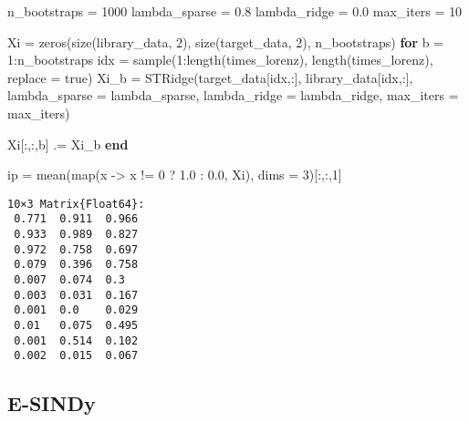 \documentclass[
]{article}
\newenvironment{Shaded}{\begin{snugshade}}{\end{snugshade}}
\newcommand{\ConstantTok}[1]{\textcolor[rgb]{0.56,0.35,0.01}{#1}}
\newcommand{\ControlFlowTok}[1]{\textcolor[rgb]{0.00,0.23,0.31}{\textbf{#1}}}
\newcommand{\FloatTok}[1]{\textcolor[rgb]{0.68,0.00,0.00}{#1}}
\newcommand{\FunctionTok}[1]{\textcolor[rgb]{0.28,0.35,0.67}{#1}}
\newcommand{\NormalTok}[1]{\textcolor[rgb]{0.00,0.23,0.31}{#1}}
\newcommand{\OperatorTok}[1]{\textcolor[rgb]{0.37,0.37,0.37}{#1}}
\begin{document}
\begin{Shaded}
\begin{Highlighting}[]
\NormalTok{n\_bootstraps }\OperatorTok{=} \FloatTok{1000}
\NormalTok{lambda\_sparse }\OperatorTok{=} \FloatTok{0.8}
\NormalTok{lambda\_ridge }\OperatorTok{=} \FloatTok{0.0}
\NormalTok{max\_iters }\OperatorTok{=} \FloatTok{10}

\NormalTok{Xi }\OperatorTok{=} \FunctionTok{zeros}\NormalTok{(}\FunctionTok{size}\NormalTok{(library\_data, }\FloatTok{2}\NormalTok{), }\FunctionTok{size}\NormalTok{(target\_data, }\FloatTok{2}\NormalTok{), n\_bootstraps)}
\ControlFlowTok{for}\NormalTok{ b }\OperatorTok{=} \FloatTok{1}\OperatorTok{:}\NormalTok{n\_bootstraps}
\NormalTok{    idx }\OperatorTok{=} \FunctionTok{sample}\NormalTok{(}\FloatTok{1}\OperatorTok{:}\FunctionTok{length}\NormalTok{(times\_lorenz), }\FunctionTok{length}\NormalTok{(times\_lorenz), replace }\OperatorTok{=} \ConstantTok{true}\NormalTok{)}
\NormalTok{    Xi\_b }\OperatorTok{=} \FunctionTok{STRidge}\NormalTok{(target\_data[idx,}\OperatorTok{:}\NormalTok{], library\_data[idx,}\OperatorTok{:}\NormalTok{], }
\NormalTok{        lambda\_sparse }\OperatorTok{=}\NormalTok{ lambda\_sparse,}
\NormalTok{        lambda\_ridge }\OperatorTok{=}\NormalTok{ lambda\_ridge,}
\NormalTok{        max\_iters }\OperatorTok{=}\NormalTok{ max\_iters)}

\NormalTok{    Xi[}\OperatorTok{:}\NormalTok{,}\OperatorTok{:}\NormalTok{,b] }\OperatorTok{.=}\NormalTok{ Xi\_b}
\ControlFlowTok{end}

\NormalTok{ip }\OperatorTok{=} \FunctionTok{mean}\NormalTok{(}\FunctionTok{map}\NormalTok{(x }\OperatorTok{{-}\textgreater{}}\NormalTok{ x }\OperatorTok{!=} \FloatTok{0}\NormalTok{ ? }\FloatTok{1.0} \OperatorTok{:} \FloatTok{0.0}\NormalTok{, Xi), dims }\OperatorTok{=} \FloatTok{3}\NormalTok{)[}\OperatorTok{:}\NormalTok{,}\OperatorTok{:}\NormalTok{,}\FloatTok{1}\NormalTok{]}
\end{Highlighting}
\end{Shaded}

\begin{verbatim}
10×3 Matrix{Float64}:
 0.771  0.911  0.966
 0.933  0.989  0.827
 0.972  0.758  0.697
 0.079  0.396  0.758
 0.007  0.074  0.3
 0.003  0.031  0.167
 0.001  0.0    0.029
 0.01   0.075  0.495
 0.001  0.514  0.102
 0.002  0.015  0.067
\end{verbatim}

\subsection{E-SINDy}\label{e-sindy}
\end{document}
